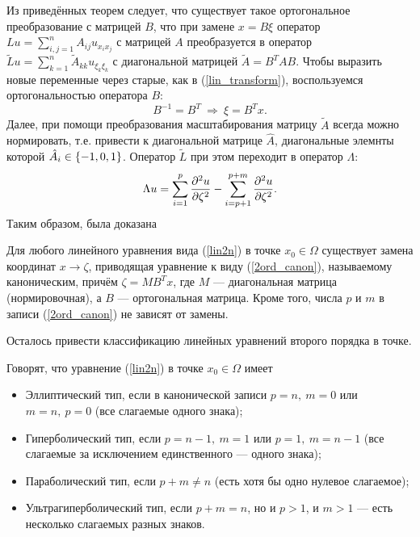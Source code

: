     Из приведённых теорем следует, что существует такое ортогональное преобразование с матрицей $B$, что при замене $x = B\xi$ оператор
    $Lu = \sum_{i,j = 1}^n A_{ij}u_{x_i x_j}$ с матрицей $A$ преобразуется в оператор $\tilde{L}u = \sum_{k = 1}^n \tilde{A}_{kk} u_{\xi_k \xi_k}$
    с диагональной матрицей $\tilde{A} = B^T AB$. Чтобы выразить новые переменные через старые, как в (\ref{lin_transform}), воспользуемся ортогональностью
    оператора $B$:
    \begin{equation*}
        B^{-1} = B^T \: \Rightarrow \: \xi = B^T x.
    \end{equation*}
    Далее, при помощи преобразования масштабирования матрицу $\tilde{A}$ всегда можно нормировать, т.е. привести к диагональной матрице $\hat{A}$, диагональные элемнты которой $\hat{A}_i \in \left\{{-1,0,1}\right\}$. Оператор $\tilde{L}$ при этом переходит в оператор $\Lambda$:
    \begin{equation}
        \Lambda u = \sum_{i = 1}^p \frac{\partial^2u}{\partial{\zeta}^2} - \sum_{i = p+1}^{p+m} \frac{\partial^2u}{\partial{\zeta}^2}. \label{2ord_canon}
    \end{equation}
\newpage
    Таким образом, была доказана
    \begin{theorem}
        Для любого линейного уравнения вида (\ref{lin2n}) в точке $x_0 \in \Omega$ существует замена координат $x \rightarrow \zeta$,
        приводящая уравнение к виду (\ref{2ord_canon}), называемому каноническим, причём $\zeta = MB^T x$, где $M$ --- диагональная матрица
        (нормировочная), а $B$ --- ортогональная матрица. Кроме того, числа $p$ и $m$ в записи (\ref{2ord_canon}) не зависят от замены.
    \end{theorem}
    Осталось привести классификацию линейных уравнений второго порядка в точке.
    \begin{Def}
        Говорят, что уравнение (\ref{lin2n}) в точке $x_0 \in \Omega$ имеет
        \begin{itemize}
            \item Эллиптический тип, если в канонической записи $p = n,\: m = 0$ или $m = n,\: p = 0$ (все слагаемые одного знака);
            \item Гиперболический тип, если $p = n-1,\: m = 1$ или $p = 1,\: m = n-1$ (все слагаемые за исключением единственного --- одного знака);
            \item Параболический тип, если $p + m \not= n$ (есть хотя бы одно нулевое слагаемое);
            \item Ультрагиперболический тип, если $p + m = n$, но и $p > 1$, и $m > 1$ --- есть несколько слагаемых разных знаков.
        \end{itemize}
    \end{Def}

